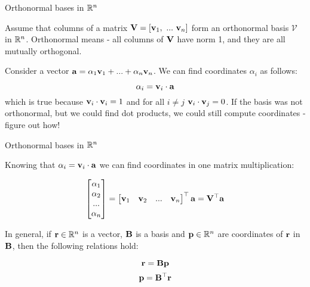 \documentclass{beamer}
\begin{document}
\begin{frame}{Orthonormal bases in $\mathbb{R}^n$}
	\begin{flushleft}
		
		Assume that columns of a matrix $\mathbf{V} = [\mathbf{v}_1, \ ... \ \mathbf{v}_n]$ form an orthonormal basis $\mathcal{V}$ in $\mathbb{R}^n$. Orthonormal means - all columns of $\mathbf{V}$ have norm 1, and they are all mutually orthogonal.
		
		\bigskip
		
		Consider a vector $\mathbf{a} = \alpha_1 \mathbf{v}_1 + ... + \alpha_n \mathbf{v}_n$. We can find coordinates $\alpha_i$ as follows:
		
		\begin{equation}
			\alpha_i = \mathbf{v}_i \cdot \mathbf{a}
		\end{equation}
		which is true because $\mathbf{v}_i \cdot \mathbf{v}_i = 1$ and for all $i \neq j$ $\mathbf{v}_i \cdot \mathbf{v}_j = 0$. If the basis was not orthonormal, but we could find dot products, we could still compute coordinates - figure out how!
	
		
		
	\end{flushleft}
\end{frame}



\begin{frame}{Orthonormal bases in $\mathbb{R}^n$}
	\begin{flushleft}
		
		Knowing that $\alpha_i = \mathbf{v}_i \cdot \mathbf{a}$ we can find coordinates in one matrix multiplication:
		
		\begin{equation}
			\begin{bmatrix}
				\alpha_1 \\ \alpha_2 \\ ... \\ \alpha_n
			\end{bmatrix}
		=
			\begin{bmatrix}
				\mathbf{v}_1 & \mathbf{v}_2 & ... & \mathbf{v}_n
			\end{bmatrix}^\top
		\mathbf{a}
		=
		\mathbf{V}^\top \mathbf{a}
		\end{equation}
		
		\bigskip
		
		In general, if $\mathbf{r} \in \mathbb{R}^n$ is a vector,  $\mathbf{B}$ is a basis and $\mathbf{p} \in \mathbb{R}^n$ are coordinates of $\mathbf{r}$ in $\mathbf{B}$, then the following relations hold:
		
		\begin{equation}
			\mathbf{r} = \mathbf{B}\mathbf{p}
		\end{equation}
		\begin{equation}
			\mathbf{p} = \mathbf{B}^\top \mathbf{r}
		\end{equation}
		
		
	\end{flushleft}
\end{frame}
\end{document}
